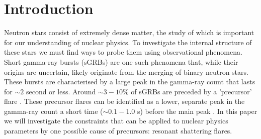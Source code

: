 \documentclass[fleqn,usenatbib]{mnras}
\begin{document}



 


\section{Introduction}
\hspace{\parindent}Neutron stars consist of extremely dense matter, the study of which is important for our understanding of nuclear physics. To investigate the internal structure of these stars we must find ways to probe them using observational phenomena. Short gamma-ray bursts (sGRBs) \citet{d2015short} are one such phenomena that, while their origins are uncertain, likely originate from the merging of binary neutron stars. These bursts are characterised by a large peak in the gamma-ray count that lasts for $\sim 2$ second or less. Around $\sim3-10$\% of sGRBs are preceded by a 'precursor' flare \citep{zhong2019precursors,troja2010precursors}. These precursor flares can be identified as a lower, separate peak in the gamma-ray count a short time ($\sim 0.1-1.0$ s) before the main peak \citet{zhong2019precursors}. In this paper we will investigate the constraints that can be applied to nuclear physics parameters by one possible cause of precursors: resonant shattering flares.
\end{document}
